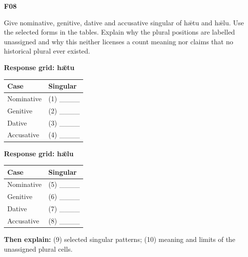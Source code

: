 \par\begin{minipage}{\linewidth}\raggedright
\textbf{F08}

Give nominative, genitive, dative and accusative singular of hǣtu and hǣlu. Use the selected forms in the tables. Explain why the plural positions are labelled unassigned and why this neither licenses a count meaning nor claims that no historical plural ever existed.

\textbf{Response grid: hǣtu}

\par\begingroup
\fontsize{10.5}{13.2}\selectfont
\setlength{\LTleft}{0pt}\setlength{\LTright}{\fill}
\noindent
\begin{tabular}{@{}>{\raggedright\arraybackslash}p{60.59mm}>{\raggedright\arraybackslash}p{60.59mm}@{}}
\toprule
\textbf{Case} & \textbf{Singular} \\
\midrule
Nominative & (1) \_\_\_\_ \\
Genitive & (2) \_\_\_\_ \\
Dative & (3) \_\_\_\_ \\
Accusative & (4) \_\_\_\_ \\
\bottomrule
\end{tabular}
\par\endgroup

\textbf{Response grid: hǣlu}

\par\begingroup
\fontsize{10.5}{13.2}\selectfont
\setlength{\LTleft}{0pt}\setlength{\LTright}{\fill}
\noindent
\begin{tabular}{@{}>{\raggedright\arraybackslash}p{60.59mm}>{\raggedright\arraybackslash}p{60.59mm}@{}}
\toprule
\textbf{Case} & \textbf{Singular} \\
\midrule
Nominative & (5) \_\_\_\_ \\
Genitive & (6) \_\_\_\_ \\
Dative & (7) \_\_\_\_ \\
Accusative & (8) \_\_\_\_ \\
\bottomrule
\end{tabular}
\par\endgroup

\textbf{Then explain:} (9) selected singular patterns; (10) meaning and limits of the unassigned plural cells.

\end{minipage}\par\addvspace{4pt}

